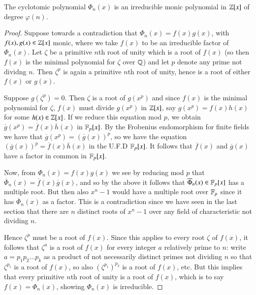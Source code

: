 \documentclass[12pt, a4paper, oneside, openright, titlepage]{book}
\begin{document}
\begin{thm}
    The cyclotomic polynomial $\Phi_n(x)$ is an irreducible monic polynomial in $\mathbb Z[x]$ of degree $\varphi(n)$.
\end{thm}
\begin{proof}
    Suppose towards a contradiction that $\Phi_n(x) = f(x)g(x)$, with $f(x),g(x) \in \mathbb Z[x]$ monic, where we take $f(x)$ to be an irreducible factor of $\Phi_n(x)$. Let $\zeta$ be a primitive $n$th root of unity which is a root of $f(x)$ (so then $f(x)$ is the minimal polynomial for $\zeta$ over $\mathbb Q$) and let $p$ denote any prime not dividng $n$. Then $\zeta^p$ is again a primitive $n$th root of unity, hence is a root of either $f(x)$ or $g(x)$.


    Suppose $g(\zeta^p) = 0$. Then $\zeta$ is a root of $g(x^p)$ and since $f(x)$ is the minimal polynomial for $\zeta$, $f(x)$ must divide $g(x^p)$ in $\mathbb Z[x]$, say $g(x^p) = f(x)h(x)$ for some $h(x) \in \mathbb Z[x]$. If we reduce this equation mod $p$, we obtain $\overline{g}(x^p) = \overline{f}(x)\overline{h}(x)$ in $\mathbb F_p[x]$. By the Frobenius endomorphism for finite fields we have that $\overline{g}(x^p) = (\overline{g}(x))^p$, so we have the equation $(\overline{g}(x))^p = \overline{f}(x)\overline{h}(x)$ in the U.F.D $\mathbb F_p[x]$. It follows that $\overline{f}(x)$ and $\overline{g}(x)$ have a factor in common in $\mathbb F_p[x]$. 

    Now, from $\Phi_n(x) = f(x)g(x)$ we see by reducing mod $p$ that $\overline{\Phi}_n(x) = \overline{f}(x)\overline{g}(x)$, and so by the above it follows that $\overline{\Phi}_n(x) \in \mathbb F_p[x]$ has a multiple root. But then also $x^n-1$ would have a multiple root over $\mathbb F_p$ since it has $\overline{\Phi}_n(x)$ as a factor. This is a contradiction since we have seen in the last section that there are $n$ distinct roots of $x^n-1$ over any field of characteristic not dividing $n$. 

    Hence $\zeta^p$ must be a root of $f(x)$. Since this applies to every root $\zeta$ of $f(x)$, it follows that $\zeta^a$ is a root of $f(x)$ for every integer $a$ relatively prime to $n$: write $a = p_1p_2...p_k$ as a product of not necessarily distinct primes not dividing $n$ so that $\zeta^{p_1}$ is a root of $f(x)$, so also $(\zeta^{p_1})^{p_2}$ is a root of $f(x)$, etc. But this implies that every primitive $n$th root of unity is a root of $f(x)$, which is to say $f(x) = \Phi_n(x)$, showing $\Phi_n(x)$ is irreducible.
\end{proof}
\end{document}
